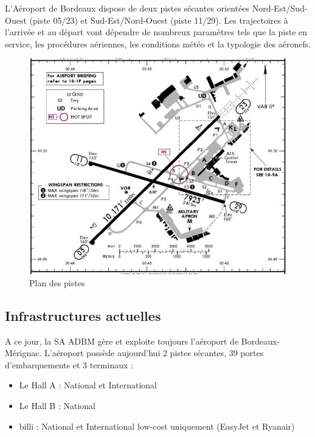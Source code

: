 L’Aéroport de Bordeaux dispose de deux pistes sécantes orientées Nord-Est/Sud-Ouest (piste 05/23) et Sud-Est/Nord-Ouest (piste 11/29). Les trajectoires à l’arrivée et au départ vont dépendre de nombreux paramètres tels que la piste en service, les procédures aériennes, les conditions météo et la typologie des aéronefs.\newline

\begin{figure}[hbt!]
  \centering
  \includegraphics[width=12.1cm]{Images/pistes.jpg}
  \caption{Plan des pistes}
  \label{fig:pistes}
\end{figure}

\newpage

\subsection{Infrastructures actuelles}


A ce jour, la SA ADBM gère et exploite toujours l'aéroport de Bordeaux-Mérignac.
L'aéroport possède aujourd'hui 2 pistes sécantes, 39 portes d'embarquements et 3 terminaux :

\begin{itemize}
    \item Le Hall A : National et International
    \item Le Hall B : National
    \item billi : National et International low-cost uniquement (EasyJet et Ryanair)\newline
\end{itemize}

